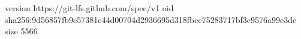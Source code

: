 version https://git-lfs.github.com/spec/v1
oid sha256:9d56857fb9e57381e44d00704d2936695d318fbce75283717bf3c9576a99c3de
size 5566
